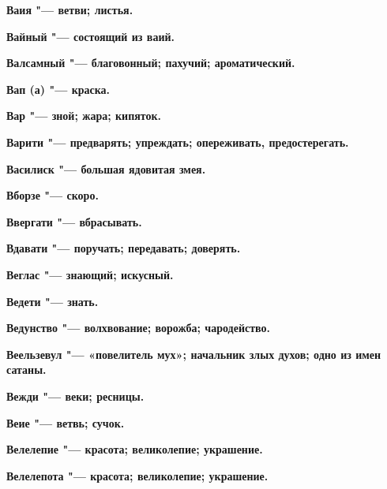 \begin{mymulticols}{2}
\bfseries Ваия\normalfont{} "--- ветви; листья. 




\bfseries Вайный\normalfont{} "--- состоящий из ваий. 




\bfseries Валсамный\normalfont{} "--- благовонный; пахучий; ароматический. 




\bfseries Вап (а)\normalfont{} "--- краска. 




\bfseries Вар\normalfont{} "--- зной; жара; кипяток. 




\bfseries Варити\normalfont{} "--- предварять; упреждать; опереживать, предостерегать. 




\bfseries Василиск\normalfont{} "--- большая ядовитая змея. 




\bfseries Вборзе\normalfont{} "--- скоро. 




\bfseries Ввергати\normalfont{} "--- вбрасывать. 




\bfseries Вдавати\normalfont{} "--- поручать; передавать; доверять. 




\bfseries Веглас\normalfont{} "--- знающий; искусный. 




\bfseries Ведети\normalfont{} "--- знать. 




\bfseries Ведунство\normalfont{} "--- волхвование; ворожба; чародейство. 




\bfseries Веельзевул\normalfont{} "--- «повелитель мух»; начальник злых духов; одно из имен сатаны. 




\bfseries Вежди\normalfont{} "--- веки; ресницы. 




\bfseries Веие\normalfont{} "--- ветвь; сучок. 




\bfseries Велелепие\normalfont{} "--- красота; великолепие; украшение. 




\bfseries Велелепота\normalfont{} "--- красота; великолепие; украшение. 





\end{mymulticols}
